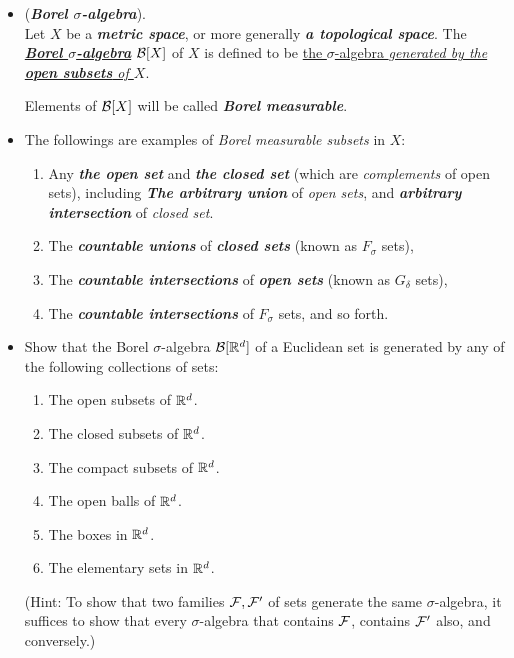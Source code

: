 \documentclass[11pt]{article}
\begin{document}
\begin{itemize}
\item \begin{definition} (\emph{\textbf{Borel $\sigma$-algebra}}). \citep{tao2011introduction} \\
 Let $X$ be a \emph{\textbf{metric space}}, or more generally \emph{\textbf{a topological space}}. The \underline{\emph{\textbf{Borel $\sigma$-algebra}}} ${\mathcal B}[X]$ of $X$ is defined to be \underline{the $\sigma$-algebra \emph{generated by the \textbf{open subsets} of $X$}}.

Elements of ${\mathcal B}[X]$ will be called \emph{\textbf{Borel measurable}}.
\end{definition}

\item \begin{example}
The followings are examples of \emph{Borel measurable subsets} in $X$: 
\begin{enumerate}
\item Any \emph{\textbf{the open set}} and \emph{\textbf{the closed set}} (which are \emph{complements} of open sets),
including \emph{\textbf{The arbitrary union}} of \emph{open sets}, and \emph{\textbf{arbitrary intersection}} of \emph{closed set}. 
\item The \emph{\textbf{countable unions}} of \emph{\textbf{closed sets}} (known as $F_{\sigma}$ sets), 
\item The \emph{\textbf{countable intersections}} of \emph{\textbf{open sets}} (known as $G_{\delta}$ sets), 
\item The \emph{\textbf{countable intersections}} of $F_{\sigma}$ sets, and so forth.
\end{enumerate}
\end{example}

\item \begin{exercise}
Show that the Borel $\sigma$-algebra ${\mathcal B}[{\mathbb R}^d]$ of a Euclidean set is generated by any of the following collections of sets:
\begin{enumerate}
\item The open subsets of ${\mathbb R}^d$.
\item The closed subsets of ${\mathbb R}^d$.
\item The compact subsets of ${\mathbb R}^d$.
\item The open balls of ${\mathbb R}^d$.
\item The boxes in ${\mathbb R}^d$.
\item The elementary sets in ${\mathbb R}^d$.
\end{enumerate} 
(Hint: To show that two families ${\mathcal F}, {\mathcal F}'$ of sets generate the same $\sigma$-algebra, it suffices to show that every $\sigma$-algebra that contains ${\mathcal F}$, contains ${\mathcal F}'$ also, and conversely.)
\end{exercise}


\end{itemize}
\end{document}
